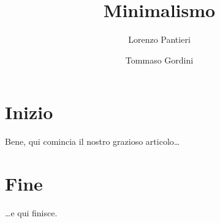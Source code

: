 \documentclass[a4paper]{article}
\begin{document}
\author{Lorenzo Pantieri \and Tommaso Gordini}
\title{Minimalismo}
\maketitle
\tableofcontents
\section{Inizio}
Bene, qui comincia il nostro grazioso articolo\dots
\section{Fine}
\dots e qui finisce.
\end{document}
